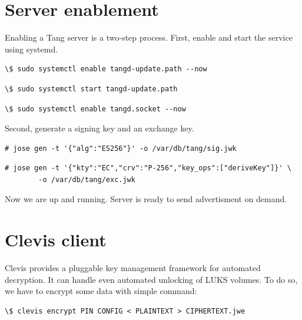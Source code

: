 \section{Server enablement}

Enabling a Tang server is a two-step process.
First, enable and start the service using systemd.
\begin{lstlisting}[columns=fixed,tabsize=4,backgroundcolor=\color{yellow!10}]
\$ sudo systemctl enable tangd-update.path --now
\end{lstlisting}
\begin{lstlisting}[columns=fixed,tabsize=4,backgroundcolor=\color{yellow!10}]
\$ sudo systemctl start tangd-update.path
\end{lstlisting}

\begin{lstlisting}[columns=fixed,tabsize=4,backgroundcolor=\color{yellow!10}]
\$ sudo systemctl enable tangd.socket --now
\end{lstlisting}


Second, generate a signing key and an exchange key.
\begin{lstlisting}[columns=fixed,tabsize=4,backgroundcolor=\color{yellow!10}]
# jose gen -t '{"alg":"ES256"}' -o /var/db/tang/sig.jwk
\end{lstlisting}

\begin{lstlisting}[columns=fixed,tabsize=4,backgroundcolor=\color{yellow!10}]
# jose gen -t '{"kty":"EC","crv":"P-256","key_ops":["deriveKey"]}' \
        -o /var/db/tang/exc.jwk
\end{lstlisting}

Now we are up and running. Server is ready to send advertisment on demand.
\todo{Get clevis in here?}


\section{Clevis client}\label{clevis}

Clevis provides a pluggable key management framework for automated decryption.
It can handle even automated unlocking of LUKS volumes.
To do so, we have to encrypt some data with simple command:

\begin{lstlisting}[columns=fixed,tabsize=4,backgroundcolor=\color{yellow!10}]
\$ clevis encrypt PIN CONFIG < PLAINTEXT > CIPHERTEXT.jwe
\end{lstlisting}

